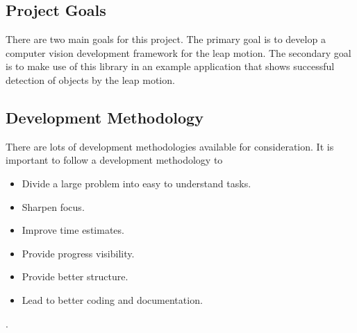 \documentclass[11pt,oneside]{report}
\begin{document}
			\subsection{Project Goals}
				There are two main goals for this project. 
				The primary goal is to develop a computer vision development framework for the leap motion. 
				The secondary goal is to make use of this library in an example application that shows successful detection of objects by the leap motion.
			
			\subsection{Development Methodology}
					There are lots of development methodologies available for consideration.
					It is important to follow a development methodology to
					\begin{itemize}
						\item Divide a large problem into easy to understand tasks.
						\item Sharpen focus.
						\item Improve time estimates.
						\item Provide progress visibility.
						\item Provide better structure.
						\item Lead to better coding and documentation.
					\end{itemize}\cite{book:dawson}.
					
\end{document}
